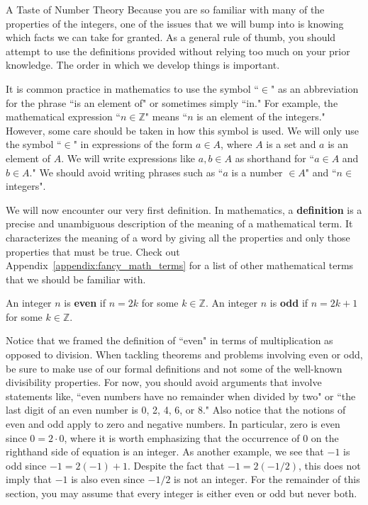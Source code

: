 \begin{section}{A Taste of Number Theory}
Because you are so familiar with many of the properties of the integers, one of the issues that we will bump into is knowing which facts we can take for granted.  As a general rule of thumb, you should attempt to use the definitions provided without relying too much on your prior knowledge.  The order in which we develop things is important.

It is common practice in mathematics to use the symbol ``$\in$" as an abbreviation for the phrase ``is an element of" or sometimes simply ``in."  For example, the mathematical expression ``$n\in\mathbb{Z}$" means ``$n$ is an element of the integers."  However, some care should be taken in how this symbol is used. We will only use the symbol ``$\in$" in expressions of the form $\boxed{a \in A}$, where $A$ is a set and $a$ is an element of $A$.  We will write  expressions like $\boxed{a,b\in A}$  as shorthand for ``$a\in A$ and $b\in A$." We should avoid writing phrases such as ``$a$ is a number $\in A$" and ``$n \in$ integers".

We will now encounter our very first definition.  In mathematics, a \textbf{definition} is a precise and unambiguous description of the meaning of a mathematical term.  It characterizes the meaning of a word by giving all the properties and only those properties that must be true.  Check out Appendix~\ref{appendix:fancy_math_terms} for a list of other mathematical terms that we should be familiar with.

\begin{definition}
An integer $n$ is \textbf{even} if $n=2k$ for some $k\in\mathbb{Z}$. An integer $n$ is \textbf{odd} if $n=2k+1$ for some $k\in\mathbb{Z}$.
\end{definition}

Notice that we framed the definition of ``even" in terms of multiplication as opposed to division. When tackling theorems and problems involving even or odd, be sure to make use of our formal definitions and not some of the well-known divisibility properties.  For now, you should avoid arguments that involve statements like, ``even numbers have no remainder when divided by two" or ``the last digit of an even number is 0, 2, 4, 6, or 8." Also notice that the notions of even and odd apply to zero and negative numbers.  In particular, zero is even since $0=2\cdot 0$, where it is worth emphasizing that the occurrence of $0$ on the righthand side of equation is an integer.  As another example, we see that $-1$ is odd since $-1=2(-1)+1$.  Despite the fact that $-1=2(-1/2)$, this does not imply that $-1$ is also even since $-1/2$ is not an integer. For the remainder of this section, you may assume that every integer is either even or odd but never both. %


\end{section}
